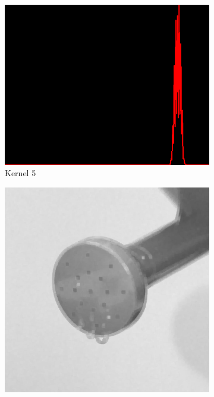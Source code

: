 \begin{figure}[H]
\begin{subfigure}[b]{0.24\textwidth}
        \includegraphics[width=\textwidth]{img3/hist_rect_5_midpoint_5_final_img3.png}
        \caption{Kernel 5}
        \label{fig:img3_kernel_5}
    \end{subfigure}
    \begin{subfigure}[b]{0.24\textwidth}
        \includegraphics[width=\textwidth]{img3/rect_7_midpoint_7_final_img3_add.png}
        \begin{center}

\end{center}
\end{subfigure}
\end{figure}
